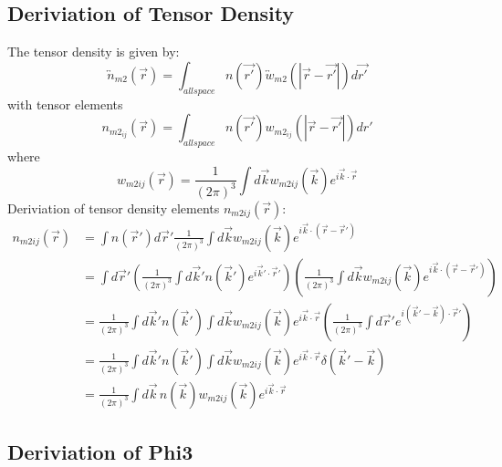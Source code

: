 \documentclass[letterpaper,twocolumn,amsmath,amssymb,prb]{revtex4-1}
\begin{document}
\begin{widetext}
\subsection{Deriviation of Tensor Density} 
\noindent The tensor density is given by:
\begin{equation}{\overleftrightarrow{n}_{m2}(\vec{r})=\int_{allspace}n(\vec{r'})\overleftrightarrow{w}_{m2}(|\vec{r}-\vec{r'}|)d{\vec{r'}}}\end{equation}
with tensor elements  
\begin{equation}{n_{m2_{ij}}(\vec{r})=\int_{allspace}n(\vec{r'})w_{m2_{ij}}(|\vec{r}-\vec{r'}|)d{r'}}\end{equation} 
where
\begin{equation}{w_{m2ij}(\vec r)= \frac1{(2\pi)^3}\int d\vec k w_{m2ij}(\vec k)e^{i\vec k\cdot \vec r}}\end{equation} 
Deriviation of tensor density elements $n_{m2ij}(\vec{r})$:
\begin{align}
    n_{m2ij}(\vec r) &= \int n(\vec r') d\vec r' \frac1{(2\pi)^3}\int d\vec k w_{m2ij}(\vec k)e^{i\vec k\cdot (\vec r-\vec r')} \\
    &= \int d\vec r' \left(\frac1{(2\pi)^3}\int d\vec k' n(\vec k')e^{i\vec k'\cdot \vec r'}\right) \left(\frac1{(2\pi)^3}\int d\vec k w_{m2ij}(\vec k)e^{i\vec k\cdot (\vec r-\vec r')}\right) \\
    &=  \frac1{(2\pi)^3}\int d\vec k' n(\vec k') \int d\vec k w_{m2ij}(\vec k)
    e^{i\vec k\cdot \vec r}\left(\frac1{(2\pi)^3}\int d\vec r'e^{i(\vec k'-\vec k)\cdot \vec r'}\right)
    \\
    &= \frac1{(2\pi)^3}\int d\vec k' n(\vec k') \int d\vec k w_{m2ij}(\vec k)e^{i\vec k\cdot \vec r}\delta(\vec k'-\vec k)
    \\
    &= \frac1{(2\pi)^3}\int d\vec k\, n(\vec k) w_{m2ij}(\vec k)e^{i\vec k\cdot \vec r}
  \end{align} 
\[{}\]


\subsection{Deriviation of Phi3}


\end{widetext}
\end{document}
